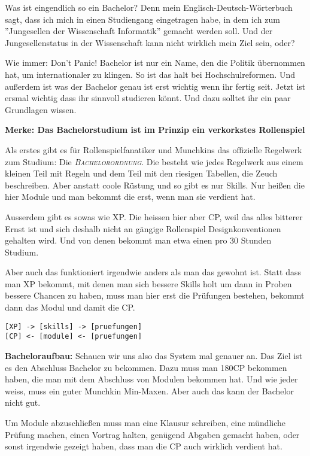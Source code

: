 Was ist eingendlich so ein Bachelor? Denn mein Englisch-Deutsch-W\"orterbuch
sagt, dass ich mich in einen Studiengang eingetragen habe, in dem ich zum
''Jungesellen der Wissenschaft Informatik'' gemacht werden soll. Und der
Jungesellenstatus in der Wissenschaft kann nicht wirklich mein Ziel sein, oder?

Wie immer: Don't Panic! Bachelor ist nur ein Name, den die Politik \"ubernommen
hat, um internationaler zu klingen.  So ist das halt bei Hochschulreformen. Und
au{\ss}erdem ist was der Bachelor genau ist erst wichtig wenn ihr fertig seit.
Jetzt ist ersmal wichtig dass ihr sinnvoll studieren k\"onnt. Und dazu solltet
ihr ein paar Grundlagen wissen.

\textbf{Merke: Das Bachelorstudium ist im Prinzip ein verkorkstes Rollenspiel}

Als erstes gibt es f\"ur Rollenspielfanatiker und Munchkins das offizielle
Regelwerk zum Studium: Die \textsc{\textit{Bachelorordnung}}. Die besteht wie jedes
Regelwerk aus einem kleinen Teil mit Regeln
und dem Teil mit den riesigen
Tabellen, die Zeuch beschreiben. Aber anstatt coole R\"ustung und so gibt es
nur Skills. Nur hei{\ss}en die hier Module und man bekommt die erst, wenn man sie
verdient hat.

Ausserdem gibt es sowas wie XP. Die heissen hier aber CP, weil das alles
bitterer Ernst ist und sich deshalb nicht an g\"angige Rollenspiel
Designkonventionen gehalten wird. Und von denen bekommt man etwa einen pro 30
Stunden Studium.

Aber auch das funktioniert irgendwie anders als man das gewohnt ist. Statt dass
man XP bekommt, mit denen man sich bessere Skills holt um dann in Proben
bessere Chancen zu haben, muss man hier erst die Pr\"ufungen bestehen, bekommt
dann das Modul und damit die CP.

{\large
\begin{verbatim}
[XP] -> [skills] -> [pruefungen]
[CP] <- [module] <- [pruefungen]
\end{verbatim}}

\textbf{Bacheloraufbau:}
Schauen wir uns also das System mal genauer an.
Das Ziel ist es den Abschluss Bachelor zu bekommen. Dazu muss man 180CP
bekommen haben, die man mit dem Abschluss von Modulen bekommen hat. Und wie
jeder weiss, muss ein guter Munchkin Min-Maxen. Aber auch das kann der Bachelor
nicht gut.

Um Module abzuschlie\ss en muss man eine Klausur schreiben, eine m\"undliche
Pr\"ufung machen, einen Vortrag halten, gen\"ugend Abgaben gemacht haben, oder
sonst irgendwie gezeigt haben, dass man die CP auch wirklich verdient hat.



